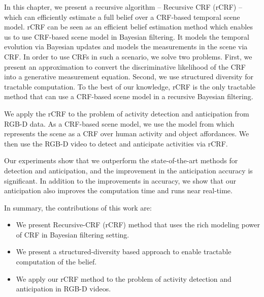 In this chapter, we present a recursive algorithm -- Recursive CRF (rCRF) -- which can efficiently estimate a full belief over a CRF-based temporal scene model. rCRF can be seen as an efficient belief estimation method which enables us to use CRF-based scene model in Bayesian filtering. It models the temporal evolution via Bayesian updates and models the measurements in the scene via CRF. In order to use CRFs in such a scenario, we solve two problems. First, we present an approximation to convert the discriminative likelihood of the CRF into a generative measurement equation. Second, we use structured diversity for tractable computation. To the best of our knowledge, rCRF is the only tractable method that can use a CRF-based scene model in a recursive Bayesian filtering.

We apply the rCRF to the problem of activity detection and anticipation from RGB-D data. As a CRF-based scene model, we use the model from \cite{hemaIJRR} which represents the scene as a CRF over human activity and object affordances. We then use the RGB-D video to detect and anticipate activities via rCRF. %

Our experiments show that we outperform the state-of-the-art methods for detection and anticipation, and the improvement in the anticipation accuracy is significant. In addition to the improvements in accuracy, we show that our anticipation also improves the computation time and runs near real-time.


In summary, the contributions of this work are:
\begin{itemize}
\item  We present Recursive-CRF (rCRF) method that uses the rich modeling power of CRF in
Bayesian filtering setting.
\item  We present a structured-diversity based approach to enable tractable computation of the belief.
\item  We apply our rCRF method to the problem of activity detection and anticipation in
RGB-D videos.
\end{itemize}
